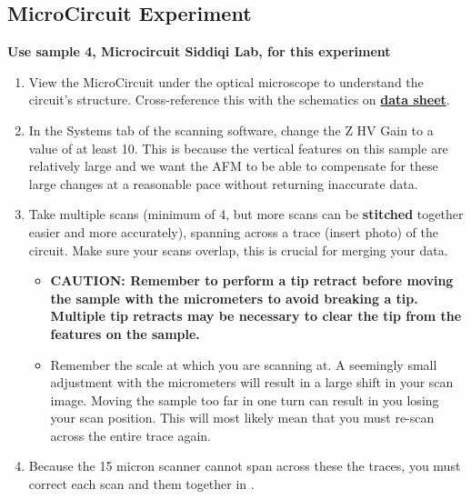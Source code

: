 \documentclass{../lab}
\begin{document}
{\begin{enumerate}
\end{enumerate}

\subsection{MicroCircuit Experiment}

\textbf{Use sample 4, Microcircuit Siddiqi Lab, for this experiment}

\begin{enumerate}
    \item View the MicroCircuit under the optical microscope to understand the circuit's structure. Cross-reference this with the schematics on \href{http://experimentationlab.berkeley.edu/sites/default/files/AFMImages/CSQ\_Resonators\_1July2011\%20.pdf}{\textbf{data sheet}}.

    \item In the Systems tab of the scanning software, change the Z HV Gain to a value of at least 10.  This is because the vertical features on this sample are relatively large and we want the AFM to be able to compensate for these large changes at a reasonable pace without returning inaccurate data.

    \item Take multiple scans (minimum of 4, but more scans can be \textbf{stitched} together easier and more accurately), spanning across a trace (insert photo) of the circuit.  Make sure your scans overlap, this is crucial for merging your data.

    \begin{itemize}
        \item \textbf{CAUTION: Remember to perform a tip retract before moving the sample with the micrometers to avoid breaking a tip. Multiple tip retracts may be necessary to clear the tip from the features on the sample.}

        \item ​Remember the scale at which you are scanning at. A seemingly small adjustment with the micrometers will result in a large shift in your scan image. Moving the sample too far in one turn can result in you losing your scan position.  This will most likely mean that you must re-scan across the entire trace again.

    \end{itemize}

    \item Because the 15 micron scanner cannot span across these the traces, you must correct each scan and \textbf{} them together in\textbf{ }.


\end{enumerate}}
\end{document}
